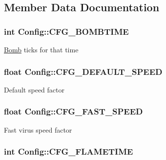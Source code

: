 \subsection{Member Data Documentation}
\hypertarget{class_config_a0574d1159f4788df4ba510d1d3e83498}{
\subsubsection[{C\-F\-G\-\_\-\-B\-O\-M\-B\-T\-I\-M\-E}]{\setlength{\rightskip}{0pt plus 5cm}int Config\-::\-C\-F\-G\-\_\-\-B\-O\-M\-B\-T\-I\-M\-E}}\label{class_config_a0574d1159f4788df4ba510d1d3e83498}
\hyperlink{class_bomb}{Bomb} ticks for that time \hypertarget{class_config_a8f2b0ec592b0bda65e2133e21fe46979}{
\subsubsection[{C\-F\-G\-\_\-\-D\-E\-F\-A\-U\-L\-T\-\_\-\-S\-P\-E\-E\-D}]{\setlength{\rightskip}{0pt plus 5cm}float Config\-::\-C\-F\-G\-\_\-\-D\-E\-F\-A\-U\-L\-T\-\_\-\-S\-P\-E\-E\-D}}\label{class_config_a8f2b0ec592b0bda65e2133e21fe46979}
Default speed factor \hypertarget{class_config_a2e8f4b387f08e51b6bfc9c27905beb60}{
\subsubsection[{C\-F\-G\-\_\-\-F\-A\-S\-T\-\_\-\-S\-P\-E\-E\-D}]{\setlength{\rightskip}{0pt plus 5cm}float Config\-::\-C\-F\-G\-\_\-\-F\-A\-S\-T\-\_\-\-S\-P\-E\-E\-D}}\label{class_config_a2e8f4b387f08e51b6bfc9c27905beb60}
Fast virus speed factor \hypertarget{class_config_a2660688203b9170918c7e2e8e5b54ed4}{
\subsubsection[{C\-F\-G\-\_\-\-F\-L\-A\-M\-E\-T\-I\-M\-E}]{\setlength{\rightskip}{0pt plus 5cm}int Config\-::\-C\-F\-G\-\_\-\-F\-L\-A\-M\-E\-T\-I\-M\-E}}\label{class_config_a2660688203b9170918c7e2e8e5b54ed4}
